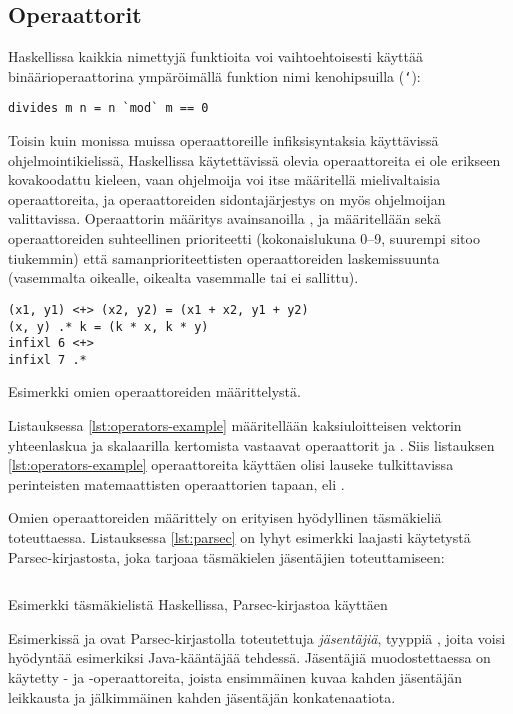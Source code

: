 \subsection{Operaattorit}
Haskellissa kaikkia nimettyjä funktioita voi vaihtoehtoisesti käyttää binäärioperaattorina ympäröimällä funktion nimi kenohipsuilla (\texttt{`}):
\begin{verbatim}
divides m n = n `mod` m == 0
\end{verbatim}

Toisin kuin monissa muissa operaattoreille infiksisyntaksia käyttävissä ohjelmointikielissä,
Haskellissa käytettävissä olevia operaattoreita ei ole erikseen kovakoodattu kieleen,
vaan ohjelmoija voi itse määritellä mielivaltaisia operaattoreita,
ja operaattoreiden sidontajärjestys on myös ohjelmoijan valittavissa.
Operaattorin määritys avainsanoilla ,  ja  määritellään sekä
operaattoreiden suhteellinen prioriteetti (kokonaislukuna 0--9, suurempi sitoo tiukemmin) että
samanprioriteettisten operaattoreiden laskemissuunta
(vasemmalta oikealle, oikealta vasemmalle tai ei sallittu).

\begin{listing}[H]
\begin{verbatim}
(x1, y1) <+> (x2, y2) = (x1 + x2, y1 + y2)
(x, y) .* k = (k * x, k * y)
infixl 6 <+>
infixl 7 .*
\end{verbatim}
\label{lst:operators-example}
\caption{Esimerkki omien operaattoreiden määrittelystä.}
\end{listing}

Listauksessa \ref{lst:operators-example} määritellään kaksiuloitteisen vektorin yhteenlaskua
ja skalaarilla kertomista vastaavat operaattorit \Haskell{<+>} ja .
Siis listauksen \ref{lst:operators-example} operaattoreita käyttäen olisi lauseke
 tulkittavissa perinteisten matemaattisten operaattorien tapaan,
eli .

Omien operaattoreiden määrittely on erityisen hyödyllinen täsmäkieliä toteuttaessa.
Listauksessa \ref{lst:parsec} on lyhyt esimerkki laajasti käytetystä Parsec-kirjastosta,
joka tarjoaa täsmäkielen jäsentäjien toteuttamiseen:
\begin{listing}[H]
    \inputminted{haskell}{codes/Parsec.hs}
    \label{lst:parsec}
    \caption{Esimerkki täsmäkielistä Haskellissa, Parsec-kirjastoa käyttäen}
\end{listing}
Esimerkissä  ja  ovat Parsec-kirjastolla toteutettuja \emph{jäsentäjiä},
tyyppiä , joita voisi hyödyntää esimerkiksi Java-kääntäjää tehdessä.
Jäsentäjiä muodostettaessa on käytetty \Haskell{<|>}- ja \Haskell{>>} -operaattoreita,
joista ensimmäinen kuvaa kahden jäsentäjän leikkausta ja jälkimmäinen kahden jäsentäjän konkatenaatiota.

